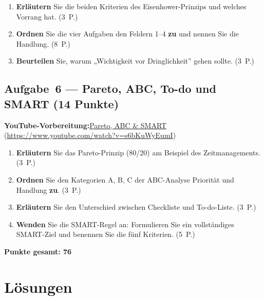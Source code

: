 \documentclass[11pt, a4paper]{article}
\begin{document}
\begin{enumerate}[label=(\alph*)]
  \item \textbf{Erläutern} Sie die beiden Kriterien des Eisenhower-Prinzips und welches Vorrang hat. \hfill (3~P.)
  \item \textbf{Ordnen} Sie die vier Aufgaben den Feldern 1--4 \textbf{zu} und nennen Sie die Handlung. \hfill (8~P.)
  \item \textbf{Beurteilen} Sie, warum „Wichtigkeit vor Dringlichkeit” gehen sollte. \hfill (3~P.)
\end{enumerate}

\subsection*{Aufgabe~6 --- Pareto, ABC, To-do und SMART (14 Punkte)}

\noindent\textbf{\color{bfwAccent}YouTube-Vorbereitung:}\enspace \href{https://www.youtube.com/watch?v=s6bKuWyEumI}{Pareto, ABC \& SMART} (\url{https://www.youtube.com/watch?v=s6bKuWyEumI})

\medskip
\begin{enumerate}[label=(\alph*)]
  \item \textbf{Erläutern} Sie das Pareto-Prinzip (80/20) am Beispiel des Zeitmanagements. \hfill (3~P.)
  \item \textbf{Ordnen} Sie den Kategorien A, B, C der ABC-Analyse Priorität und Handlung \textbf{zu}. \hfill (3~P.)
  \item \textbf{Erläutern} Sie den Unterschied zwischen Checkliste und To-do-Liste. \hfill (3~P.)
  \item \textbf{Wenden} Sie die SMART-Regel an: Formulieren Sie ein vollständiges SMART-Ziel und benennen Sie die fünf Kriterien. \hfill (5~P.)
\end{enumerate}

\vspace{1em}
\noindent\textbf{Punkte gesamt: 76}

\newpage

\section{Lösungen}\label{loesungen}
\end{document}
